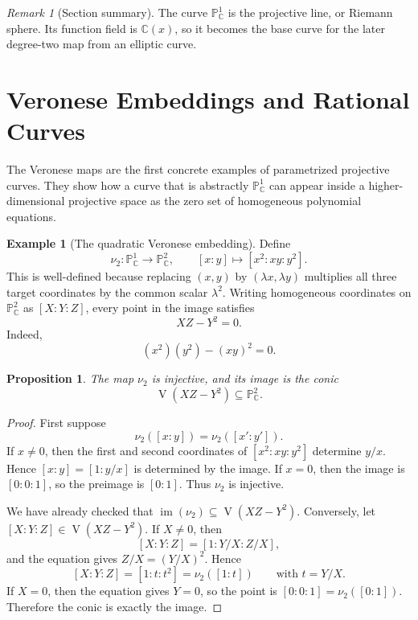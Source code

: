 \documentclass[11pt]{article}
\newtheorem{proposition}[theorem]{Proposition}
\theoremstyle{definition}
\newtheorem{example}[theorem]{Example}
\theoremstyle{remark}
\newtheorem{remark}[theorem]{Remark}
\newcommand{\C}{\mathbb{C}}
\newcommand{\Pj}{\mathbb{P}}
\newcommand{\V}{\operatorname{V}}
\newcommand{\image}{\operatorname{im}}
\begin{document}
\begin{remark}[Section summary]
The curve \(\Pj^1_{\C}\) is the projective line, or Riemann sphere.  Its
function field is \(\C(x)\), so it becomes the base curve for the later
degree-two map from an elliptic curve.
\end{remark}

\section{Veronese Embeddings and Rational Curves}

The Veronese maps are the first concrete examples of parametrized projective
curves.  They show how a curve that is abstractly \(\Pj^1_{\C}\) can appear
inside a higher-dimensional projective space as the zero set of homogeneous
polynomial equations.

\begin{example}[The quadratic Veronese embedding]
Define
\[
  \nu_2\colon \Pj^1_{\C}\longrightarrow \Pj^2_{\C},
  \qquad
  [x:y]\longmapsto [x^2:xy:y^2].
\]
This is well-defined because replacing \((x,y)\) by \((\lambda x,\lambda y)\)
multiplies all three target coordinates by the common scalar \(\lambda^2\).
Writing homogeneous coordinates on \(\Pj^2_{\C}\) as \([X:Y:Z]\), every point
in the image satisfies
\[
  XZ-Y^2=0.
\]
Indeed,
\[
  (x^2)(y^2)-(xy)^2=0.
\]
\end{example}

\begin{proposition}
The map \(\nu_2\) is injective, and its image is the conic
\[
  \V(XZ-Y^2)\subseteq \Pj^2_{\C}.
\]
\end{proposition}

\begin{proof}
First suppose
\[
  \nu_2([x:y])=\nu_2([x':y']).
\]
If \(x\neq 0\), then the first and second coordinates of
\([x^2:xy:y^2]\) determine \(y/x\).  Hence
\([x:y]=[1:y/x]\) is determined by the image.  If \(x=0\), then the image is
\([0:0:1]\), so the preimage is \([0:1]\).  Thus \(\nu_2\) is injective.

We have already checked that \(\image(\nu_2)\subseteq \V(XZ-Y^2)\).  Conversely,
let \([X:Y:Z]\in \V(XZ-Y^2)\).  If \(X\neq 0\), then
\[
  [X:Y:Z]=[1:Y/X:Z/X],
\]
and the equation gives \(Z/X=(Y/X)^2\).  Hence
\[
  [X:Y:Z]=[1:t:t^2]=\nu_2([1:t])
  \qquad \text{with } t=Y/X.
\]
If \(X=0\), then the equation gives \(Y=0\), so the point is
\([0:0:1]=\nu_2([0:1])\).  Therefore the conic is exactly the image.
\end{proof}
\end{document}
